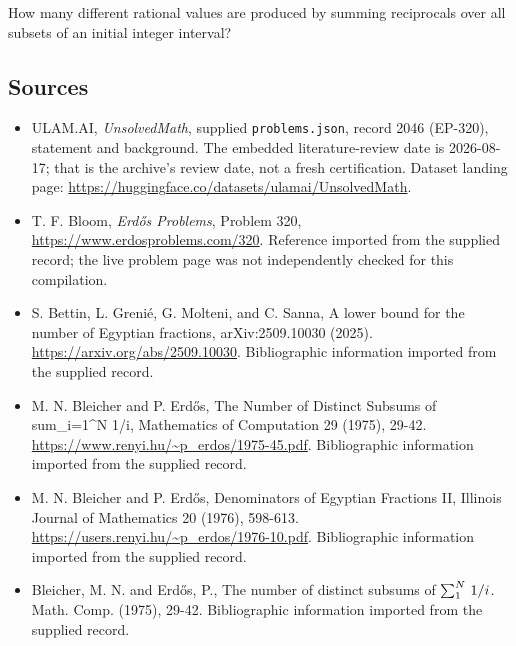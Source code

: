 \documentclass[11pt,a4paper]{article}
\begin{document}
How many different rational values are produced by summing reciprocals over all subsets of an initial integer interval?

\subsection{Sources}

{\small

\begin{itemize}

\item[\hypertarget{source:2046:1}{S1}] ULAM.AI, \emph{UnsolvedMath}, supplied \texttt{problems.json}, record 2046 (EP-320), statement and background. The embedded literature-review date is 2026-08-17; that is the archive’s review date, not a fresh certification. Dataset landing page: \url{https://huggingface.co/datasets/ulamai/UnsolvedMath}.

\item[\hypertarget{source:2046:2}{S2}] T. F. Bloom, \emph{Erdős Problems}, Problem 320, \url{https://www.erdosproblems.com/320}. Reference imported from the supplied record; the live problem page was not independently checked for this compilation.

\item[\hypertarget{source:2046:3}{S3}] S. Bettin, L. Grenié, G. Molteni, and C. Sanna, A lower bound for the number of Egyptian fractions, arXiv:2509.10030 (2025). \url{https://arxiv.org/abs/2509.10030}. Bibliographic information imported from the supplied record.

\item[\hypertarget{source:2046:4}{S4}] M. N. Bleicher and P. Erdős, The Number of Distinct Subsums of sum\_{i=1}\textasciicircum{}N 1/i, Mathematics of Computation 29 (1975), 29-42. \url{https://www.renyi.hu/~p_erdos/1975-45.pdf}. Bibliographic information imported from the supplied record.

\item[\hypertarget{source:2046:5}{S5}] M. N. Bleicher and P. Erdős, Denominators of Egyptian Fractions II, Illinois Journal of Mathematics 20 (1976), 598-613. \url{https://users.renyi.hu/~p_erdos/1976-10.pdf}. Bibliographic information imported from the supplied record.

\item[\hypertarget{source:2046:6}{S6}] Bleicher, M. N. and Erd\H{o}s, P., The number of distinct subsums of $\sum \sb{1}^{N}\,1/i$. Math. Comp. (1975), 29-42. Bibliographic information imported from the supplied record.

\end{itemize}

}

\label{end:2046}
\end{document}

